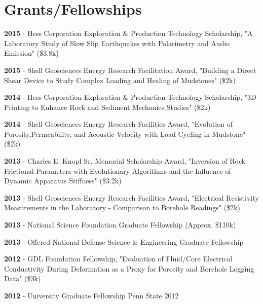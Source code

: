 \documentclass[letterpaper]{article}
\renewenvironment{itemize}{
  \begin{list}{}{
    \setlength{\leftmargin}{1.5em}
  }
}{
  \end{list}
}
\begin{document}
\section*{Grants/Fellowships}
\begin{itemize}
\item \textbf{2015} - Hess Corporation Exploration \& Production Technology Scholarship, "A Laboratory Study of Slow Slip Earthquakes with Polarimetry and Audio Emission" (\$3.8k)
\item \textbf{2015} - Shell Geosciences Energy Research Facilitation Award, "Building a Direct Shear Device to Study Complex Loading and Healing of Mudstones" (\$2k)
\item \textbf{2014} - Hess Corporation Exploration \& Production Technology Scholarship, "3D Printing to Enhance Rock and Sediment Mechanics Studies" (\$2k)
\item \textbf{2014} - Shell Geosciences Energy Research Facilities Award, "Evolution of Porosity,Permeability, and Acoustic Velocity with Load Cycling in Mudstone" (\$2k)
\item \textbf{2013} - Charles E. Knopf Sr. Memorial Scholarship Award, "Inversion of Rock Frictional Parameters with Evolutionary Algorithms and the Influence of Dynamic Apparatus Stiffness" (\$3.2k)
\item \textbf{2013} - Shell Geosciences Energy Research Facilities Award, "Electrical Resistivity Measurements in the Laboratory - Comparison to Borehole Readings" (\$2k)
\item \textbf{2013} - National Science Foundation Graduate Fellowship (Approx. \$110k)
\item \textbf{2013} - Offered National Defense Science \& Engineering Graduate Fellowship
\item \textbf{2012} - GDL Foundation Fellowship, "Evaluation of Fluid/Core Electrical Conductivity During Deformation as a Proxy for Porosity and Borehole Logging Data" (\$3k)
\item \textbf{2012} - University Graduate Fellowship Penn State 2012
\end{itemize}
\end{document}
